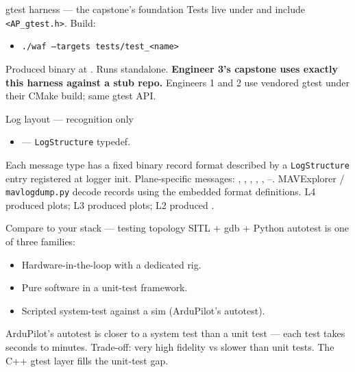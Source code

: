 \documentclass[aspectratio=169,11pt]{beamer}
\begin{document}
\begin{frame}{gtest harness --- the capstone's foundation}
  Tests live under  and include \texttt{<AP\_gtest.h>}.
  \vfill
  Build:
  \begin{itemize}
    \item[\$] \texttt{./waf --targets tests/test\_<name>}
  \end{itemize}
  \vfill
  Produced binary at . Runs standalone.
  \vfill
  \textbf{Engineer 3's capstone uses exactly this harness against a stub repo.}
  \vfill
  Engineers 1 and 2 use vendored gtest under their CMake build; same gtest API.
\end{frame}

\begin{frame}{Log layout --- recognition only}
  \begin{itemize}
    \item {} --- \texttt{LogStructure} typedef.
  \end{itemize}
  \vfill
  Each message type has a fixed binary record format described by a \texttt{LogStructure} entry registered at logger init.
  \vfill
  Plane-specific messages: , , , , , --.
  \vfill
  MAVExplorer / \texttt{mavlogdump.py} decode records using the embedded format definitions. L4 produced  plots; L3 produced  plots; L2 produced .
\end{frame}

\begin{frame}{Compare to your stack --- testing topology}
  SITL + gdb + Python autotest is one of three families:
  \begin{itemize}
    \item Hardware-in-the-loop with a dedicated rig.
    \item Pure software in a unit-test framework.
    \item Scripted system-test against a sim (ArduPilot's autotest).
  \end{itemize}
  \vfill
  ArduPilot's autotest is closer to a system test than a unit test --- each test takes seconds to minutes.
  \vfill
  Trade-off: very high fidelity vs slower than unit tests. The C++ gtest layer fills the unit-test gap.
\end{frame}

\end{document}
